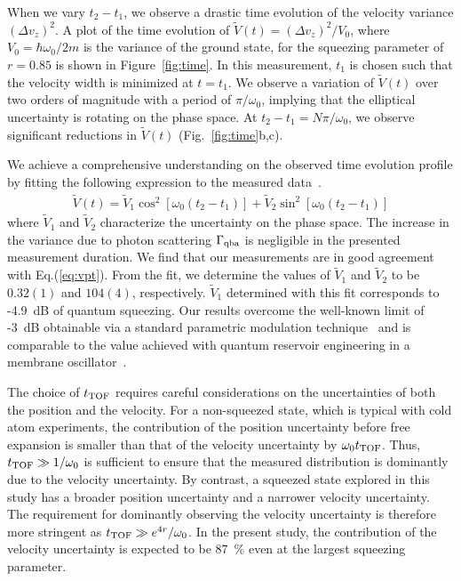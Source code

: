 \documentclass[aps, prl, 
amsmath, showpacs, preprintnumbers, twocolumn, amssymb, amsmath, superscriptaddress]{revtex4-1}
\begin{document}
When we vary $t_2-t_1$, we observe a drastic time evolution of the velocity variance $(\Delta v_z)^2$. A plot of the time evolution of $\tilde{V}(t)=(\Delta v_z)^2/V_0$, where $V_{0} =  \hbar \omega_0/2m$ is the variance of the ground state, for the squeezing parameter of $r=0.85$ is shown in Figure~\ref{fig:time}. In this measurement, $t_1$ is chosen such that the velocity width is minimized at $t=t_1$. We observe a variation of $\tilde{V}(t)$ over two orders of magnitude with a period of $\pi/\omega_0$, implying that the elliptical uncertainty is rotating on the phase space. At $t_2-t_1=N \pi/\omega_0 $, we observe significant reductions in $\tilde{V}(t)$ (Fig.~\ref{fig:time}b,c). 

We achieve a comprehensive understanding on the observed time evolution profile by fitting the following expression to the measured data~\cite{rossi2024quantum}.
\begin{eqnarray}
\tilde{V}(t) = \tilde{V}_{1} \cos^2 \left[ \omega_0 (t_2-t_1) \right] +\tilde{V}_{2} \sin^2 \left[ \omega_0 (t_2-t_1) \right]
\label{eq:vpt}
\end{eqnarray}
where $\tilde{V}_{1}$ and $\tilde{V}_{2}$ characterize the uncertainty on the phase space. The increase in the variance due to photon scattering $\Gamma_{\rm qba}$ is negligible in the presented measurement duration. We find that our measurements are in good agreement with Eq.(\ref{eq:vpt}). From the fit, we determine the values of $\tilde{V}_{1}$ and $\tilde{V}_{2}$ to be $0.32(1)$ and $104(4)$, respectively. $\tilde{V}_{1}$ determined with this fit corresponds to -4.9~dB of quantum squeezing. Our results overcome the well-known limit of -3~dB obtainable via a standard parametric modulation technique~\cite{milburn1981production} and is comparable to the value achieved with quantum reservoir engineering in a membrane oscillator~\cite{lei2016quantum}.

The choice of $t_{\rm TOF}$ requires careful considerations on the uncertainties of both the position and the velocity. For a non-squeezed state, which is typical with cold atom experiments, the contribution of the position uncertainty before free expansion is smaller than that of the velocity uncertainty by $\omega_0 t_{\rm TOF}$. Thus, $t_{\rm TOF} \gg 1/\omega_0$ is sufficient to ensure that the measured distribution is dominantly due to the velocity uncertainty. By contrast, a squeezed state explored in this study has a broader position uncertainty and a narrower velocity uncertainty. The requirement for dominantly observing the velocity uncertainty is therefore more stringent as  $t_{\rm TOF} \gg e^{4r}/\omega_0$. In the present study, the contribution of the velocity uncertainty is expected to be 87~\% even at the largest squeezing parameter. 
\end{document}
